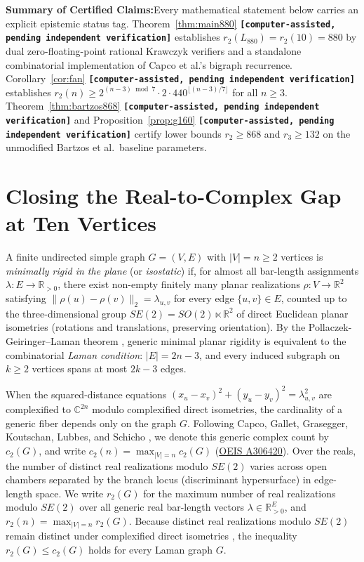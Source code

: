 \documentclass[11pt,a4paper]{article}
\theoremstyle{definition}
\theoremstyle{remark}
\newcommand{\claimtag}[1]{\textup{\textbf{\texttt{[#1]}}}}
\newcommand{\takeaway}[2]{%
  \vspace{6pt}\noindent\colorbox{primary!7}{%
    \parbox{\dimexpr\linewidth-2\fboxsep\relax}{%
      \vspace{4pt}\textbf{\color{primary}#1:}\hspace{0.5em}#2\vspace{4pt}%
    }%
  }\vspace{6pt}%
}
\begin{document}
\takeaway{Summary of Certified Claims}{Every mathematical statement below carries an explicit epistemic status tag. Theorem~\ref{thm:main880} \claimtag{computer-assisted, pending independent verification} establishes $r_2(L_{880}) = r_2(10) = 880$ by dual zero-floating-point rational Krawczyk verifiers and a standalone combinatorial implementation of Capco et al.'s bigraph recurrence. Corollary~\ref{cor:fan} \claimtag{computer-assisted, pending independent verification} establishes $r_2(n) \ge 2^{(n-3)\bmod 7}\cdot 2\cdot 440^{\lfloor (n-3)/7\rfloor}$ for all $n \ge 3$. Theorem~\ref{thm:bartzos868} \claimtag{computer-assisted, pending independent verification} and Proposition~\ref{prop:g160} \claimtag{computer-assisted, pending independent verification} certify lower bounds $r_2 \ge 868$ and $r_3 \ge 132$ on the unmodified Bartzos et al.\ baseline parameters.}

\section{Closing the Real-to-Complex Gap at Ten Vertices}

A finite undirected simple graph $G = (V, E)$ with $|V| = n \ge 2$ vertices is \emph{minimally rigid in the plane} (or \emph{isostatic}) if, for almost all bar-length assignments $\lambda \colon E \to \mathbb{R}_{>0}$, there exist non-empty finitely many planar realizations $\rho \colon V \to \mathbb{R}^2$ satisfying $\|\rho(u) - \rho(v)\|_2 = \lambda_{u,v}$ for every edge $\{u,v\} \in E$, counted up to the three-dimensional group $SE(2) = SO(2) \ltimes \mathbb{R}^2$ of direct Euclidean planar isometries (rotations and translations, preserving orientation). By the Pollaczek-Geiringer--Laman theorem \cite{Pol27,Lam70,CGGKLS18}, generic minimal planar rigidity is equivalent to the combinatorial \emph{Laman condition}: $|E| = 2n - 3$, and every induced subgraph on $k \ge 2$ vertices spans at most $2k - 3$ edges.

When the squared-distance equations $(x_u - x_v)^2 + (y_u - y_v)^2 = \lambda_{u,v}^2$ are complexified to $\mathbb{C}^{2n}$ modulo complexified direct isometries, the cardinality of a generic fiber depends only on the graph $G$. Following Capco, Gallet, Grasegger, Koutschan, Lubbes, and Schicho \cite{CGGKLS18}, we denote this generic complex count by $c_2(G)$, and write $c_2(n) = \max_{|V|=n} c_2(G)$ (\href{https://oeis.org/A306420}{OEIS A306420}). Over the reals, the number of distinct real realizations modulo $SE(2)$ varies across open chambers separated by the branch locus (discriminant hypersurface) in edge-length space. We write $r_2(G)$ for the maximum number of real realizations modulo $SE(2)$ over all generic real bar-length vectors $\lambda \in \mathbb{R}_{>0}^E$, and $r_2(n) = \max_{|V|=n} r_2(G)$. Because distinct real realizations modulo $SE(2)$ remain distinct under complexified direct isometries \cite[Section~1]{CGGKLS18}, the inequality $r_2(G) \le c_2(G)$ holds for every Laman graph $G$.
\end{document}
